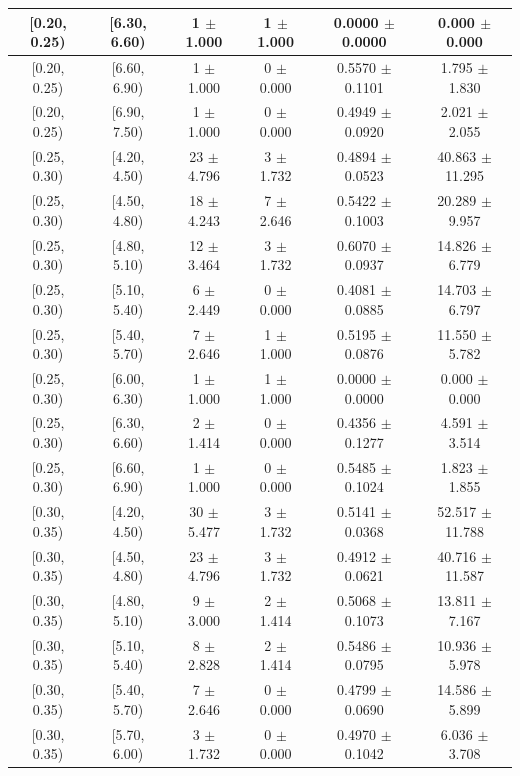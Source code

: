 \begin{longtable}{|c|c|c|c|c|c|}
\hline
[0.20, 0.25) & [6.30, 6.60) & 1 $\pm$ 1.000 & 1 $\pm$ 1.000 & 0.0000 $\pm$ 0.0000 & 0.000 $\pm$ 0.000 \\ 
\hline
[0.20, 0.25) & [6.60, 6.90) & 1 $\pm$ 1.000 & 0 $\pm$ 0.000 & 0.5570 $\pm$ 0.1101 & 1.795 $\pm$ 1.830 \\ 
\hline
[0.20, 0.25) & [6.90, 7.50) & 1 $\pm$ 1.000 & 0 $\pm$ 0.000 & 0.4949 $\pm$ 0.0920 & 2.021 $\pm$ 2.055 \\ 
\hline
[0.25, 0.30) & [4.20, 4.50) & 23 $\pm$ 4.796 & 3 $\pm$ 1.732 & 0.4894 $\pm$ 0.0523 & 40.863 $\pm$ 11.295 \\ 
\hline
[0.25, 0.30) & [4.50, 4.80) & 18 $\pm$ 4.243 & 7 $\pm$ 2.646 & 0.5422 $\pm$ 0.1003 & 20.289 $\pm$ 9.957 \\ 
\hline
[0.25, 0.30) & [4.80, 5.10) & 12 $\pm$ 3.464 & 3 $\pm$ 1.732 & 0.6070 $\pm$ 0.0937 & 14.826 $\pm$ 6.779 \\ 
\hline
[0.25, 0.30) & [5.10, 5.40) & 6 $\pm$ 2.449 & 0 $\pm$ 0.000 & 0.4081 $\pm$ 0.0885 & 14.703 $\pm$ 6.797 \\ 
\hline
[0.25, 0.30) & [5.40, 5.70) & 7 $\pm$ 2.646 & 1 $\pm$ 1.000 & 0.5195 $\pm$ 0.0876 & 11.550 $\pm$ 5.782 \\ 
\hline
[0.25, 0.30) & [6.00, 6.30) & 1 $\pm$ 1.000 & 1 $\pm$ 1.000 & 0.0000 $\pm$ 0.0000 & 0.000 $\pm$ 0.000 \\ 
\hline
[0.25, 0.30) & [6.30, 6.60) & 2 $\pm$ 1.414 & 0 $\pm$ 0.000 & 0.4356 $\pm$ 0.1277 & 4.591 $\pm$ 3.514 \\ 
\hline
[0.25, 0.30) & [6.60, 6.90) & 1 $\pm$ 1.000 & 0 $\pm$ 0.000 & 0.5485 $\pm$ 0.1024 & 1.823 $\pm$ 1.855 \\ 
\hline
[0.30, 0.35) & [4.20, 4.50) & 30 $\pm$ 5.477 & 3 $\pm$ 1.732 & 0.5141 $\pm$ 0.0368 & 52.517 $\pm$ 11.788 \\ 
\hline
[0.30, 0.35) & [4.50, 4.80) & 23 $\pm$ 4.796 & 3 $\pm$ 1.732 & 0.4912 $\pm$ 0.0621 & 40.716 $\pm$ 11.587 \\ 
\hline
[0.30, 0.35) & [4.80, 5.10) & 9 $\pm$ 3.000 & 2 $\pm$ 1.414 & 0.5068 $\pm$ 0.1073 & 13.811 $\pm$ 7.167 \\ 
\hline
[0.30, 0.35) & [5.10, 5.40) & 8 $\pm$ 2.828 & 2 $\pm$ 1.414 & 0.5486 $\pm$ 0.0795 & 10.936 $\pm$ 5.978 \\ 
\hline
[0.30, 0.35) & [5.40, 5.70) & 7 $\pm$ 2.646 & 0 $\pm$ 0.000 & 0.4799 $\pm$ 0.0690 & 14.586 $\pm$ 5.899 \\ 
\hline
[0.30, 0.35) & [5.70, 6.00) & 3 $\pm$ 1.732 & 0 $\pm$ 0.000 & 0.4970 $\pm$ 0.1042 & 6.036 $\pm$ 3.708 \\ 

\end{longtable}
